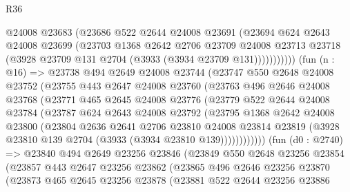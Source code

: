\begin{lexlean}{R36}
\begin{coremodule}
                  @24008
                  @23683
                  (@23686
                    @522
                    @2644
                    @24008
                    @23691
                    (@23694
                      @624
                      @2643
                      @24008
                      @23699
                      (@23703
                        @1368
                        @2642
                        @2706
                        @23709
                        @24008
                        @23713
                        @23718
                        (@3928 @23709 @131 @2704 (@3933 (@3934 @23709 @131)))))))))))
        (fun (n : @16) =>
        @23738
          @494
          @2649
          @24008
          @23744
          (@23747
            @550
            @2648
            @24008
            @23752
            (@23755
              @443
              @2647
              @24008
              @23760
              (@23763
                @496
                @2646
                @24008
                @23768
                (@23771
                  @465
                  @2645
                  @24008
                  @23776
                  (@23779
                    @522
                    @2644
                    @24008
                    @23784
                    (@23787
                      @624
                      @2643
                      @24008
                      @23792
                      (@23795
                        @1368
                        @2642
                        @24008
                        @23800
                        (@23804
                          @2636
                          @2641
                          @2706
                          @23810
                          @24008
                          @23814
                          @23819
                          (@3928 @23810 @139 @2704 (@3933 (@3934 @23810 @139))))))))))))
        (fun (d0 : @2740) =>
        @23840
          @494
          @2649
          @23256
          @23846
          (@23849
            @550
            @2648
            @23256
            @23854
            (@23857
              @443
              @2647
              @23256
              @23862
              (@23865
                @496
                @2646
                @23256
                @23870
                (@23873
                  @465
                  @2645
                  @23256
                  @23878
                  (@23881
                    @522
                    @2644
                    @23256
                    @23886

\end{coremodule}
\end{lexlean}
